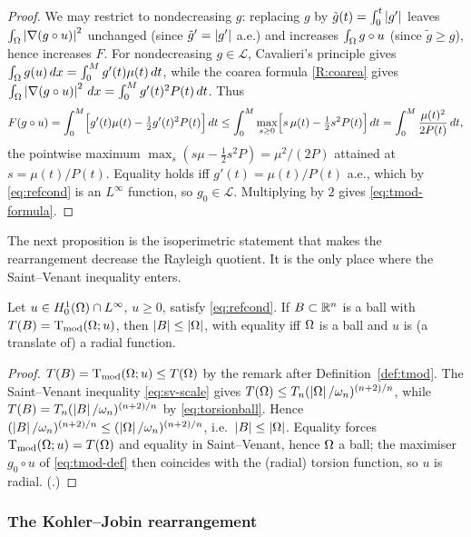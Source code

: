 \begin{proof}
We may restrict to nondecreasing $g$: replacing $g$ by
$\tilde g(t)=\int_0^t\left|g'\right|$ leaves $\int_\Omega\left|\nabla(g\circ u)\right|^2$
unchanged (since $\tilde g'=\left|g'\right|$ a.e.) and increases $\int_\Omega g\circ
u$ (since $\tilde g\ge g$), hence increases $F$. For nondecreasing
$g\in\mathcal L$, Cavalieri's principle gives
$\int_\Omega g(u)\,dx=\int_0^M g'(t)\mu(t)\,dt$, while the coarea formula
\ref{R:coarea} gives
$\int_\Omega\left|\nabla(g\circ u)\right|^2\,dx=\int_0^M g'(t)^2 P(t)\,dt$. Thus
\[
  F(g\circ u)=\int_0^M\Bigl[g'(t)\mu(t)-\tfrac12 g'(t)^2 P(t)\Bigr]\,dt
  \le\int_0^M\max_{s\ge0}\Bigl[s\,\mu(t)-\tfrac12 s^2 P(t)\Bigr]\,dt
  =\int_0^M\frac{\mu(t)^2}{2P(t)}\,dt,
\]
the pointwise maximum $\max_s(s\mu-\tfrac12 s^2P)=\mu^2/(2P)$ attained at
$s=\mu(t)/P(t)$. Equality holds iff $g'(t)=\mu(t)/P(t)$ a.e., which by
\eqref{eq:refcond} is an $L^\infty$ function, so $g_0\in\mathcal L$.
Multiplying by $2$ gives \eqref{eq:tmod-formula}.
\end{proof}

The next proposition is the isoperimetric statement that makes the
rearrangement decrease the Rayleigh quotient. It is the only place where
the Saint--Venant inequality enters.

\begin{proposition}\label{prop:isop-tmod}
Let $u\in H^1_0(\Omega)\cap L^\infty$, $u\ge0$, satisfy \eqref{eq:refcond}.
If $B\subset\mathbb R^n$ is a ball with $T(B)=\operatorname{T_{\mathrm{mod}}}(\Omega;u)$, then $\left|B\right|\le\left|\Omega\right|$,
with equality iff $\Omega$ is a ball and $u$ is (a translate of) a radial
function.
\end{proposition}

\begin{proof}
$T(B)=\operatorname{T_{\mathrm{mod}}}(\Omega;u)\le T(\Omega)$ by the remark after
Definition~\ref{def:tmod}. The Saint--Venant inequality \eqref{eq:sv-scale}
gives $T(\Omega)\le T_n(\left|\Omega\right|/\omega_n)^{(n+2)/n}$, while
$T(B)=T_n(\left|B\right|/\omega_n)^{(n+2)/n}$ by \eqref{eq:torsionball}. Hence
$(\left|B\right|/\omega_n)^{(n+2)/n}\le(\left|\Omega\right|/\omega_n)^{(n+2)/n}$, i.e.\
$\left|B\right|\le\left|\Omega\right|$. Equality forces $\operatorname{T_{\mathrm{mod}}}(\Omega;u)=T(\Omega)$ and equality in
Saint--Venant, hence $\Omega$ a ball; the maximiser $g_0\circ u$ of
\eqref{eq:tmod-def} then coincides with the (radial) torsion function, so
$u$ is radial. (\cite[Prop.~3.8]{Brasco2014}.)
\end{proof}

\subsubsection*{The Kohler--Jobin rearrangement}

